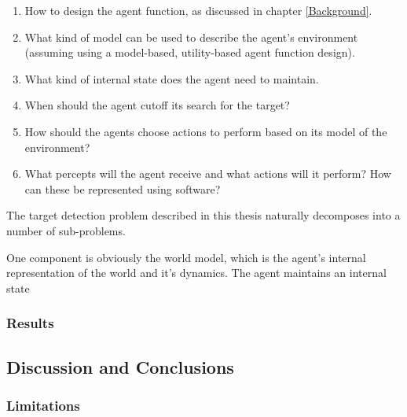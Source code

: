 \begin{enumerate}
    \item How to design the agent function, as discussed in chapter \ref{Background}.
    \item What kind of model can be used to describe the agent's environment (assuming using a model-based, utility-based agent function design).
    \item What kind of internal state does the agent need to maintain.
    \item When should the agent cutoff its search for the target?
    \item How should the agents choose actions to perform based on its model of the environment?
    \item What percepts will the agent receive and what actions will it perform? How can these be represented using software?
\end{enumerate}

The target detection problem described in this thesis naturally decomposes into a number of sub-problems. %

One component is obviously the world model, which is the agent's internal representation of the world and it's dynamics. The agent maintains an internal state
\subsubsection{Results}

\subsection{Discussion and Conclusions}
\subsubsection{Limitations}
